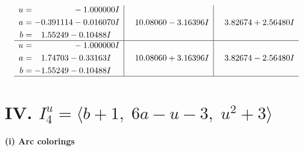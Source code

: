 \documentclass[1p]{elsarticle_modified}
\theoremstyle{definition}
\begin{document}
$$\begin{array}{c|c|c}
\begin{aligned}
u &= \phantom{-0.000000 } -1.000000 I \\
a &= -0.391114 - 0.016070 I \\
b &= \phantom{-}1.55249 - 0.10488 I\end{aligned}
 & \phantom{-}10.08060 - 3.16396 I & \phantom{-}3.82674 + 2.56480 I \\ \hline\begin{aligned}
u &= \phantom{-0.000000 } -1.000000 I \\
a &= \phantom{-}1.74703 - 0.33163 I \\
b &= -1.55249 - 0.10488 I\end{aligned}
 & \phantom{-}10.08060 + 3.16396 I & \phantom{-}3.82674 - 2.56480 I\\
 \hline 
 \end{array}$$\newpage\newpage\renewcommand{\arraystretch}{1}
\centering \section*{IV. $I^u_{4}= \langle b+1,\;6 a- u-3,\;u^2+3 \rangle$}
\flushleft \textbf{(i) Arc colorings}\\
\end{document}
